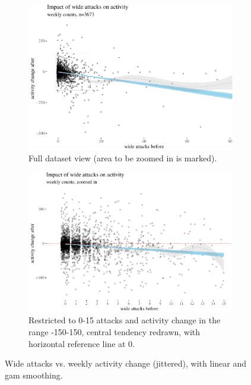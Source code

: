 \documentclass[10pt,]{scrartcl}
\begin{document}
\begin{figure}
\begin{subfigure}[b]{0.95\textwidth}

\begin{center}\includegraphics[width=1\linewidth]{redditAnalysisWalkthrough_files/figure-latex/unnamed-chunk-11-1} \end{center}
\caption{Full dataset view (area to be zoomed in is marked).}
\end{subfigure}
 
\begin{subfigure}[b]{0.95\textwidth}

\begin{center}\includegraphics[width=1\linewidth]{redditAnalysisWalkthrough_files/figure-latex/unnamed-chunk-12-1} \end{center}
\caption{Restricted to 0-15 attacks and activity change in the range -150-150, central tendency redrawn, with horizontal reference line at 0.}
\end{subfigure}
\caption{Wide attacks vs. weekly activity change (jittered), with  linear and gam smoothing.}
\label{fig:lowPlots}
\end{figure}
\end{document}
